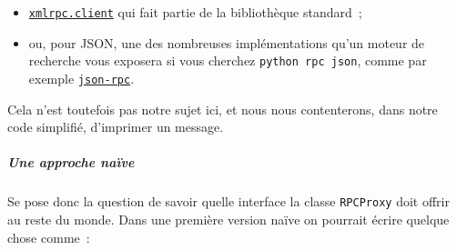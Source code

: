 \begin{itemize}
\tightlist
\item
  \href{https://docs.python.org/3/library/xmlrpc.client.html}{\texttt{xmlrpc.client}}
  qui fait partie de la bibliothèque standard~;
\item
  ou, pour JSON, une des nombreuses implémentations qu'un moteur de
  recherche vous exposera si vous cherchez \texttt{python\ rpc\ json},
  comme par exemple
  \href{https://pypi.python.org/pypi/json-rpc/}{\texttt{json-rpc}}.
\end{itemize}

Cela n'est toutefois pas notre sujet ici, et nous nous contenterons,
dans notre code simplifié, d'imprimer un message.

    \hypertarget{une-approche-nauxefve}{%
\subparagraph{Une approche naïve}\label{une-approche-nauxefve}}

    Se pose donc la question de savoir quelle interface la classe
\texttt{RPCProxy} doit offrir au reste du monde. Dans une première
version naïve on pourrait écrire quelque chose comme~:

